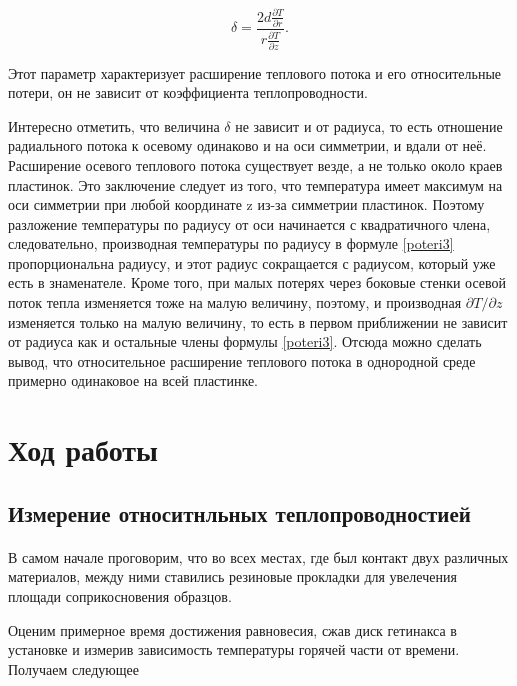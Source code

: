 \documentclass[a4paper, 12pt]{article}
\begin{document}
    \begin{equation}\label{poteri3}
    \delta = \frac{2d \frac{\partial T}{\partial r}}{r \frac{\partial T}{\partial z}}.
    \end{equation}

    Этот параметр характеризует расширение теплового потока и его относительные потери, он не зависит от коэффициента теплопроводности.

    Интересно отметить, что величина $ \delta $ не зависит и от радиуса, то есть отношение радиального потока к осевому одинаково и на оси симметрии, и вдали от неё. Расширение осевого теплового потока существует везде, а не только около краев пластинок. Это заключение следует из того, что температура имеет максимум на оси симметрии при любой координате z из-за симметрии пластинок. Поэтому разложение температуры по радиусу от оси начинается с квадратичного члена, следовательно, производная температуры по радиусу в формуле \eqref{poteri3} пропорциональна радиусу, и этот радиус сокращается с радиусом, который уже есть в знаменателе. Кроме того, при малых потерях через боковые стенки осевой поток тепла изменяется тоже на малую величину, поэтому, и производная $ \partial T/\partial z $ изменяется только на малую величину, то есть в первом приближении не зависит от радиуса как и остальные члены формулы \eqref{poteri3}. Отсюда можно сделать вывод, что относительное расширение теплового потока в однородной среде примерно одинаковое на всей пластинке.

    \section{Ход работы}
    \subsection{Измерение относитнльных теплопроводностией}
    \paragraph{}
    В самом начале проговорим, что во всех местах, где был контакт двух различных материалов, между ними ставились резиновые прокладки для увелечения площади соприкосновения образцов. \newline


    Оценим примерное время достижения равновесия, сжав диск гетинакса в установке и измерив зависимость температуры горячей части от времени. Получаем следующее
\end{document}
